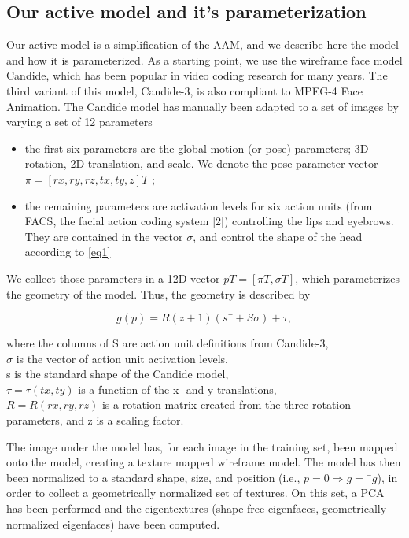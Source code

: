 \documentclass[12pt]{spieman}  %
\begin{document}
\begin{spacing}{2}   

\section{Our active model and it’s parameterization}
\label{sect:intro}  %
Our active model is a simplification of the AAM, and we describe here the model and how it is parameterized. As a starting point, we use the wireframe face model Candide, which has been popular in video coding research for many years. The third variant of this model, Candide-3, is also compliant to MPEG-4 Face Animation. The Candide model has manually been adapted to a set of images by varying a set of 12 parameters
\begin{itemize}
    \item the first six parameters are the global motion (or pose) parameters; 3D-rotation, 2D-translation, and scale. We denote the pose parameter vector $\pi = [rx ,ry ,rz ,tx ,ty ,z]T$ ;
    \item the remaining parameters are activation levels for six action units (from FACS, the facial action coding system [2]) controlling the lips and eyebrows. They are contained in the vector $\sigma$, and control the shape of the head according to \eqref{eq1}
\end{itemize}

We collect those parameters in a 12D vector $pT = [\pi T, \sigma T]$, which parameterizes the geometry of the model. Thus, the geometry is described by

\begin{equation}
    g(p)= R(z + 1)(s¯+ S\sigma)+ \tau,
    \label{eq1}
\end{equation}

where the columns of S are action unit definitions from Candide-3, \\
$\sigma$ is the vector of action unit activation levels, \\
s is the standard shape of the Candide model, \\
$\tau = \tau(tx,ty)$ is a function of the x- and y-translations, \\
$R = R(rx ,ry ,rz)$ is a rotation matrix created from the three rotation parameters, and z is a scaling factor.

The image under the model has, for each image in the training set, been mapped onto the model, creating a texture mapped wireframe model. The model has then been normalized to a standard shape, size, and position (i.e., $p = 0 \Rightarrow{} g = ¯g$), in order to collect a geometrically normalized set of textures. On this set, a PCA has been performed and the eigentextures (shape free eigenfaces, geometrically normalized eigenfaces) have been computed. 


\end{spacing}
\end{document}
